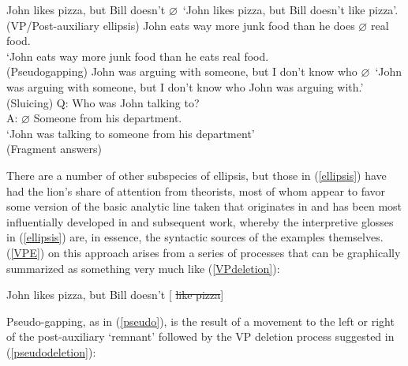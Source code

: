 \documentclass[output=paper,colorlinks,citecolor=brown]{langscibook}
\begin{document}
\begin{exe}
 \ex\label{ellipsis}
  \begin{xlist}
 \ex\label{VPE}
    John likes pizza, but Bill doesn't $\varnothing$\bsl\xspace\
    `John likes pizza, but Bill doesn't like pizza'. \\
    (VP/Post-auxiliary ellipsis)
 \ex\label{pseudo}
    John eats way more junk food than he does $\varnothing$ real food.\\
    `John eats way more junk food than he eats real food. \\
    (Pseudogapping)
 \ex\label{sluice}
    John was arguing with someone, but I don't know who
  $\varnothing$\bsl\xspace\
    `John was arguing with someone, but I don't know who John was
  arguing with.' \\
    (Sluicing)
 \ex\label{shortans}
   \textsf{Q:} Who was John talking to? \\
   \textsf{A:} $\varnothing$ Someone from his department.\\
   `John was talking to someone from his department'\\
   (Fragment answers)
  \end{xlist}
\end{exe}
There are a number of other subspecies of ellipsis, but those in
(\ref{ellipsis}) have had the lion's share of attention from theorists, most
of whom appear to favor some version of the basic analytic line taken
that originates in \citet{kuno81} and has been most influentially developed
in \citet{merchant01} and subsequent work, whereby the interpretive glosses
in (\ref{ellipsis}) are, in essence, the syntactic sources of the examples
themselves. (\ref{VPE}) on this approach arises from a series of processes
that can be graphically summarized as something very much like
(\ref{VPdeletion}):

\begin{exe}
 \ex\label{VPdeletion}
  John likes pizza, but Bill doesn't [ \sout{like pizza}]
\end{exe}
Pseudo-gapping, as in (\ref{pseudo}), is the result of a movement to the
left or right of the post-auxiliary `remnant' followed by the VP
deletion process suggested in (\ref{pseudodeletion}):
\end{document}
